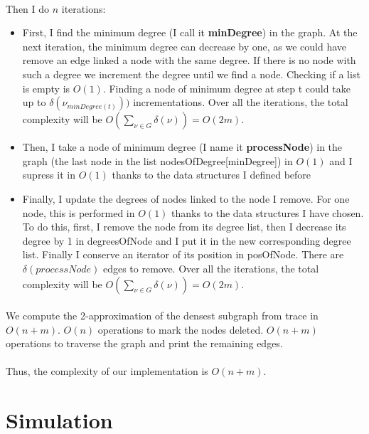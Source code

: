 \documentclass[english]{article}
\begin{document}
\begin{multicols}{2}
\paragraph{}
Then I do $n$ iterations:
\begin{itemize}
	\item First, I find the minimum degree (I call it {\bf minDegree}) in the graph. At the next iteration, the minimum degree can decrease by one, as we could have remove an edge linked a node with the same degree. If there is no node with such a degree we increment the degree until we find a node. Checking if a list is empty is $O(1)$. Finding a node of minimum degree at step t could take up to $\delta(\nu_{minDegree(t)}))$ incrementations. Over all the iterations, the total complexity will be $O(\sum_{\nu \in G}{\delta(\nu)}) = O(2m)$.
	\item Then, I take a node of minimum degree (I name it {\bf processNode}) in the graph (the last node in the list nodesOfDegree[minDegree]) in $O(1)$ and I supress it in $O(1)$ thanks to the data structures I defined before
	\item Finally, I update the degrees of nodes linked to the node I remove. For one node, this is performed in $O(1)$ thanks to the data structures I have chosen. \newline
	To do this, first, I remove the node from its degree list, then I decrease its degree by 1 in degreesOfNode and I put it in the new corresponding degree list. Finally I conserve an iterator of its position in posOfNode. \newline There are $\delta(processNode)$ edges to remove. Over all the iterations, the total complexity will be $O(\sum_{\nu \in G}{\delta(\nu)}) = O(2m)$.
\end{itemize}
\paragraph{}
We compute the 2-approximation of the densest subgraph from trace in $O(n+m)$.
$O(n)$ operations to mark the nodes deleted.
$O(n+m)$ operations to traverse the graph and print the remaining edges.
\paragraph{}
Thus, the complexity of our implementation is $O(n+m)$.
\section{Simulation}

\end{multicols}
\end{document}
